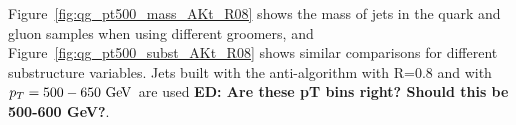 Figure~\ref{fig:qg_pt500_mass_AKt_R08} shows the mass of jets in the quark and gluon samples when using
different groomers, and Figure~\ref{fig:qg_pt500_subst_AKt_R08} shows similar comparisons for different 
substructure variables. Jets built with the anti-\kT algorithm with
R=0.8 and with $\pt=500-650 \GeV$ are used {\bf ED: Are these pT bins
  right? Should this be 500-600 GeV?}. 
\begin{figure}
\begin{center}
\\

\end{center}
\end{figure}
